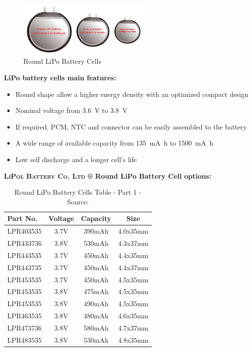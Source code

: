 \documentclass[report.tex]{subfiles}
\begin{document}
\begin{figure}[H]
	\centering
	\includegraphics[width=0.6\textwidth]{Include/Figure/Hardware/Round-LiPo-Batteries.jpg}
	\caption{Round LiPo Battery Cells\cite{roundLipoCell}}
	\label{fig:RoundLiPoBatteries}
\end{figure}

\begin{flushleft}
\textbf{LiPo battery cells main features:}
\end{flushleft}
\begin{itemize}
\item Round shape allow a higher energy density with an optimized compact design
\item Nominal voltage from \SI{3.6}{\volt} to \SI{3.8}{\volt}
\item If required, PCM, NTC and connector can be easily assembled to the battery
\item A wide range of available capacity from \SI{135}{\milli\ampere\hour} to \SI{1500}{\milli\ampere\hour}
\item Low self discharge and a longer cell's life
\end{itemize}

\textbf{\textsc{LiPol Battery Co. Ltd ®} Round LiPo Battery Cell options:}

\begin{table}[H]
\centering
\begin{tabular}{|l|c|c|c|}\hline
Part No.		&	Voltage 	&	Capacity		&	Size		\\\hline
LPR403535	&	3.7V 	&	390mAh		&	4.0x35mm \\\hline
LPR433736	&	3.8V 	&	530mAh		&	4.3x37mm \\\hline
LPR443535	&	3.7V 	& 	450mAh		&	4.4x35mm \\
LPR443735	&	3.7V 	& 	450mAh		&	4.4x37mm \\\hline
LPR453535	&	3.7V 	& 	450mAh		&	4.5x35mm \\
LPR453535	&	3.8V 	& 	475mAh		&	4.5x35mm \\
LPR453535	&	3.8V 	& 	490mAh		&	4.5x35mm \\\hline
LPR463535	&	3.8V 	& 	480mAh		&	4.6x35mm \\\hline
LPR473736	&	3.8V 	& 	580mAh		&	4.7x37mm \\\hline
LPR483535	&	3.8V 	& 	530mAh		&	4.8x35mm \\\hline
\end{tabular}
\caption{Round LiPo Battery Cells Table - Part 1 - Source:\cite{roundLipoCell}}
\label{tab:roundLipoCell1}
\end{table}
\end{document}
